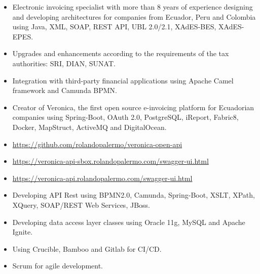 \documentclass[10pt,a4paper,ragged2e]{altacv}
\begin{document}
\vspace{5px}
\divider
\vspace{5px}

\begin{itemize}
    \item Electronic invoicing specialist with more than 8 years of experience designing and developing architectures for companies from Ecuador, Peru and Colombia using Java, XML, SOAP, REST API, UBL 2.0/2.1, XAdES-BES, XAdES-EPES.
    \item Upgrades and enhancements according to the requirements of the tax authorities: SRI, DIAN, SUNAT.
    \item Integration with third-party financial applications using Apache Camel framework and Camunda BPMN.
    \item Creator of Veronica, the first open source e-invoicing platform for Ecuadorian companies using Spring-Boot, OAuth 2.0, PostgreSQL, iReport, Fabric8, Docker, MapStruct, ActiveMQ and DigitalOcean.
    \item \url{https://github.com/rolandopalermo/veronica-open-api}
    \item \url{https://veronica-api-sbox.rolandopalermo.com/swagger-ui.html}
    \item \url{https://veronica-api.rolandopalermo.com/swagger-ui.html}
\end{itemize}

\vspace{5px}
\divider
\vspace{5px}

\begin{itemize}
    \item Developing API Rest using BPMN2.0, Camunda, Spring-Boot, XSLT, XPath, XQuery, SOAP/REST Web Services, JBoss.
    \item Developing data access layer classes using Oracle 11g, MySQL and Apache Ignite.
    \item Using Crucible, Bamboo and Gitlab for CI/CD.
    \item Scrum for agile development.
\end{itemize}
\end{document}

